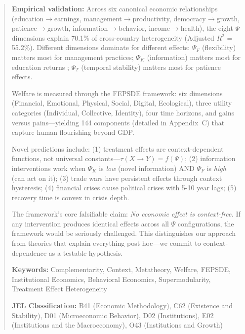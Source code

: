 \documentclass[12pt,a4paper]{article}
\begin{document}
\begin{abstract}
\textbf{Empirical validation:} Across six canonical economic relationships (education$\rightarrow$earnings, management$\rightarrow$productivity, democracy$\rightarrow$growth, patience$\rightarrow$growth, information$\rightarrow$behavior, income$\rightarrow$health), the eight $\Psi$ dimensions explain 70.1\% of cross-country heterogeneity (Adjusted $R^2$ = 55.2\%). Different dimensions dominate for different effects: $\Psi_F$ (flexibility) matters most for management practices; $\Psi_K$ (information) matters most for education returns \citep{hanushek2012}; $\Psi_T$ (temporal stability) matters most for patience effects.

Welfare is measured through the FEPSDE framework: six dimensions (Financial, Emotional, Physical, Social, Digital, Ecological), three utility categories (Individual, Collective, Identity), four time horizons, and gains versus pains---yielding 144 components (detailed in Appendix~C) that capture human flourishing beyond GDP.

Novel predictions include: (1) treatment effects are context-dependent functions, not universal constants---$\tau(X \rightarrow Y) = f(\Psi)$; (2) information interventions work when $\Psi_K$ is \emph{low} (novel information) AND $\Psi_F$ is \emph{high} (can act on it); (3) trade wars have persistent effects through context hysteresis; (4) financial crises cause political crises with 5-10 year lags; (5) recovery time is convex in crisis depth.

The framework's core falsifiable claim: \emph{No economic effect is context-free.} If any intervention produces identical effects across all $\Psi$ configurations, the framework would be seriously challenged. This distinguishes our approach from theories that explain everything post hoc---we commit to context-dependence as a testable hypothesis.

\vspace{0.5em}
\noindent\textbf{Keywords:} Complementarity, Context, Metatheory, Welfare, FEPSDE, Institutional Economics, Behavioral Economics, Supermodularity, Treatment Effect Heterogeneity

\vspace{0.5em}
\noindent\textbf{JEL Classification:} B41 (Economic Methodology), C62 (Existence and Stability), D01 (Microeconomic Behavior), D02 (Institutions), E02 (Institutions and the Macroeconomy), O43 (Institutions and Growth)
\end{abstract}

\end{document}
